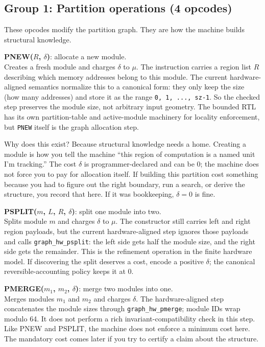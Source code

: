 \documentclass[11pt,a4paper]{article}
\theoremstyle{plain}
\theoremstyle{definition}
\theoremstyle{remark}
\begin{document}
\subsection{Group 1: Partition operations (4 opcodes)}

These opcodes modify the partition graph. They are how the machine builds structural knowledge.

\medskip
\noindent\textbf{PNEW($R$, $\delta$)}: allocate a new module.\\
Creates a fresh module and charges $\delta$ to $\mu$. The instruction carries a region list $R$ describing which memory addresses belong to this module. The current hardware-aligned semantics normalize this to a canonical form: they only keep the size (how many addresses) and store it as the range \texttt{0, 1, ..., sz-1}. So the checked step preserves the module size, not arbitrary input geometry. The bounded RTL has its own partition-table and active-module machinery for locality enforcement, but \texttt{PNEW} itself is the graph allocation step.

Why does this exist? Because structural knowledge needs a home. Creating a module is how you tell the machine ``this region of computation is a named unit I'm tracking.'' The cost $\delta$ is programmer-declared and can be 0; the machine does not force you to pay for allocation itself. If building this partition cost something because you had to figure out the right boundary, run a search, or derive the structure, you record that here. If it was bookkeeping, $\delta = 0$ is fine.

\medskip
\noindent\textbf{PSPLIT($m$, $L$, $R$, $\delta$)}: split one module into two.\\
Splits module $m$ and charges $\delta$ to $\mu$. The constructor still carries left and right region payloads, but the current hardware-aligned step ignores those payloads and calls \texttt{graph\_hw\_psplit}: the left side gets half the module size, and the right side gets the remainder. This is the refinement operation in the finite hardware model. If discovering the split deserves a cost, encode a positive $\delta$; the canonical reversible-accounting policy keeps it at 0.

\medskip
\noindent\textbf{PMERGE($m_1$, $m_2$, $\delta$)}: merge two modules into one.\\
Merges modules $m_1$ and $m_2$ and charges $\delta$. The hardware-aligned step concatenates the module sizes through \texttt{graph\_hw\_pmerge}; module IDs wrap modulo 64. It does not perform a rich invariant-compatibility check in this step. Like PNEW and PSPLIT, the machine does not enforce a minimum cost here. The mandatory cost comes later if you try to certify a claim about the structure.
\end{document}
